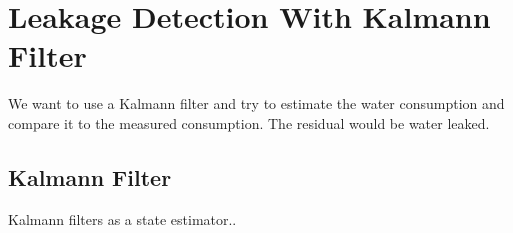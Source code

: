 \section{Leakage Detection With Kalmann Filter}
We want to use a Kalmann filter and try to estimate the water consumption and compare it to the measured consumption. The residual would be water leaked. 
   
\subsection{Kalmann Filter}
Kalmann filters as a state estimator..
